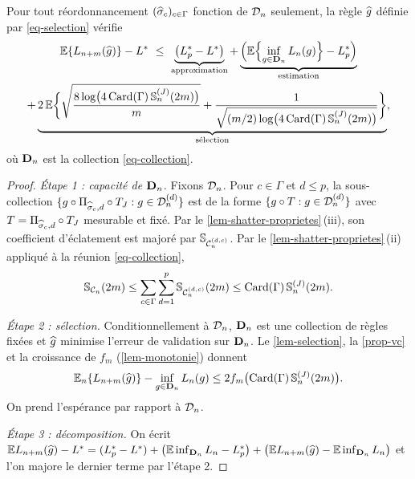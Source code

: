 \begin{theoreme}\label{thm-oracle}
Pour tout réordonnancement $(\widehat{\sigma}_c)_{c\in\Gamma}$ fonction de $\mathcal{D}_n$ seulement, la règle $\widehat{g}$ définie par \eqref{eq-selection} vérifie
\begin{multline*}
  \E\{L_{n+m}(\hg)\}-L^*\ \le\ \underbrace{\bigl(L^*_p-L^*\bigr)}_{\text{approximation}}
  +\underbrace{\Bigl(\E\Bigl\{\inf_{g\in\bD_n}L_n(g)\Bigr\}-L^*_p\Bigr)}_{\text{estimation}}\\
  +\underbrace{2\,\E\biggl\{\sqrt{\frac{8\log\bigl(4\Card(\Gamma)\,\Sh^{(J)}_n(2m)\bigr)}{m}}+\frac{1}{\sqrt{(m/2)\log\bigl(4\Card(\Gamma)\,\Sh^{(J)}_n(2m)\bigr)}}\biggr\}}_{\text{sélection}},
\end{multline*}
où $\mathbf{D}_n$ est la collection \eqref{eq-collection}.
\end{theoreme}

\begin{proof}
\emph{Étape 1 : capacité de $\mathbf{D}_n$.} Fixons $\mathcal{D}_n$. Pour $c\in\Gamma$ et $d\le p$, la sous-collection $\{g\circ\Pi_{\widehat{\sigma}_c,d}\circ T_J:g\in\mathcal{D}_n^{(d)}\}$ est de la forme $\{g\circ T:g\in\mathcal{D}_n^{(d)}\}$ avec $T=\Pi_{\widehat{\sigma}_c,d}\circ T_J$ mesurable et fixé. Par le \cref{lem-shatter-proprietes}\,(iii), son coefficient d'éclatement est majoré par $\mathbb{S}_{\mathcal{C}_n^{(d,c)}}$. Par le \cref{lem-shatter-proprietes}\,(ii) appliqué à la réunion \eqref{eq-collection},
\[
  \mathbb{S}_{\mathcal{C}_n}(2m)\le\sum_{c\in\Gamma}\sum_{d=1}^p\mathbb{S}_{\mathcal{C}_n^{(d,c)}}(2m)\le\operatorname{Card}(\Gamma)\,\mathbb{S}^{(J)}_n(2m).
\]

\emph{Étape 2 : sélection.} Conditionnellement à $\mathcal{D}_n$, $\mathbf{D}_n$ est une collection de règles fixées et $\widehat{g}$ minimise l'erreur de validation sur $\mathbf{D}_n$. Le \cref{lem-selection}, la \cref{prop-vc} et la croissance de $f_m$ (\cref{lem-monotonie}) donnent
\[
  \mathbb{E}_n\{L_{n+m}(\widehat{g})\}-\inf_{g\in\mathbf{D}_n}L_n(g)\le2f_m\bigl(\operatorname{Card}(\Gamma)\,\mathbb{S}^{(J)}_n(2m)\bigr).
\]
On prend l'espérance par rapport à $\mathcal{D}_n$.

\emph{Étape 3 : décomposition.} On écrit
$\mathbb{E} L_{n+m}(\widehat{g})-L^*=(L^*_p-L^*)+\bigl(\mathbb{E}\inf_{\mathbf{D}_n}L_n-L^*_p\bigr)+\bigl(\mathbb{E} L_{n+m}(\widehat{g})-\mathbb{E}\inf_{\mathbf{D}_n}L_n\bigr)$ et l'on majore le dernier terme par l'étape 2.
\end{proof}


